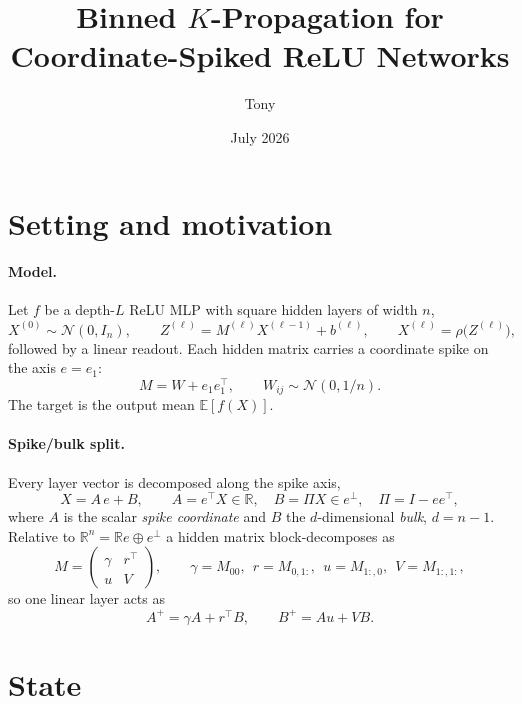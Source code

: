 \documentclass[11pt]{article}
\title{Binned $K$-Propagation for Coordinate-Spiked ReLU Networks}
\author{Tony}
\date{July 2026}
\newcommand{\E}{\mathbb{E}}
\newcommand{\R}{\mathbb{R}}
\newcommand{\N}{\mathcal{N}}
\newcommand{\relu}{\rho}
\begin{document}
\maketitle

\section{Setting and motivation}

\paragraph{Model.} Let $f$ be a depth-$L$ ReLU MLP with square hidden layers of width $n$,
\[
X^{(0)} \sim \N(0, I_n), \qquad
Z^{(\ell)} = M^{(\ell)} X^{(\ell-1)} + b^{(\ell)}, \qquad
X^{(\ell)} = \relu\big(Z^{(\ell)}\big),
\]
followed by a linear readout. Each hidden matrix carries a coordinate spike on the axis $e = e_1$:
\[
M = W + e_1 e_1^\top, \qquad W_{ij} \sim \N(0, 1/n).
\]
The target is the output mean $\E[f(X)]$.

\paragraph{Spike/bulk split.} Every layer vector is decomposed along the spike axis,
\begin{equation}
X = A\,e + B, \qquad A = e^\top X \in \R, \quad B = \Pi X \in e^\perp, \quad \Pi = I - ee^\top,
\label{eq:split}
\end{equation}
where $A$ is the scalar \emph{spike coordinate} and $B$ the $d$-dimensional \emph{bulk}, $d = n-1$. Relative to $\R^n = \R e \oplus e^\perp$ a hidden matrix block-decomposes as
\[
M = \begin{pmatrix} \gamma & r^\top \\ u & V \end{pmatrix},
\qquad \gamma = M_{00},\ \ r = M_{0,1:},\ \ u = M_{1:,0},\ \ V = M_{1:,1:},
\]
so one linear layer acts as
\begin{equation}
\boxed{\;A^+ = \gamma A + r^\top B, \qquad B^+ = A u + V B.\;}
\label{eq:linear}
\end{equation}

\section{State}
\end{document}
